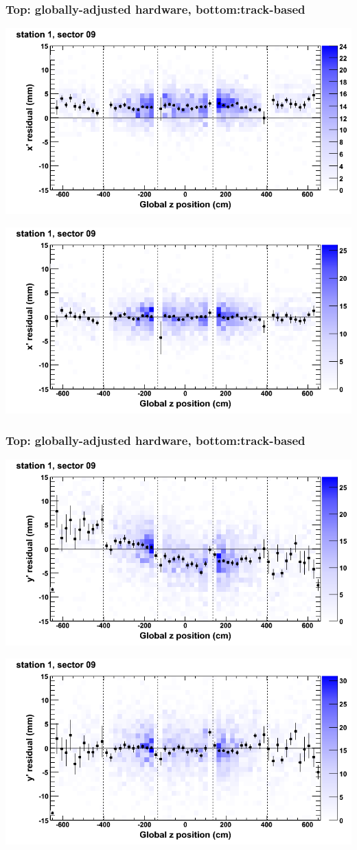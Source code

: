 \documentclass[compress]{beamer}
\begin{document}
\begin{frame}
\frametitle{Top: globally-adjusted hardware, bottom:track-based}
\includegraphics[width=0.7\linewidth]{NOV4_mapplots_HW/DTvsz_st1sec09_x.png}

\includegraphics[width=0.7\linewidth]{NOV4_mapplots/DTvsz_st1sec09_x.png}
\end{frame}

\begin{frame}
\frametitle{Top: globally-adjusted hardware, bottom:track-based}
\includegraphics[width=0.7\linewidth]{NOV4_mapplots_HW/DTvsz_st1sec09_y.png}

\includegraphics[width=0.7\linewidth]{NOV4_mapplots/DTvsz_st1sec09_y.png}
\end{frame}
\end{document}
